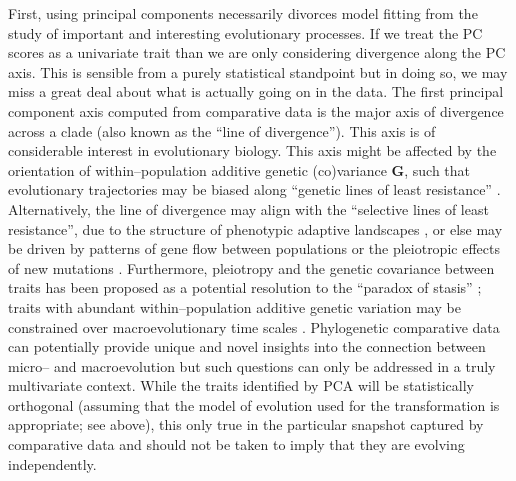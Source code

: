 \documentclass[a4paper,12pt]{article}
\begin{document}
First, using principal components necessarily divorces model fitting from the study of important and interesting evolutionary processes. If we treat the PC scores as a univariate trait than we are only considering divergence along the PC axis. This is sensible from a purely statistical standpoint but in doing so, we may miss a great deal about what is actually going on in the data. The first principal component axis computed from comparative data is the major axis of divergence across a clade (also known as the ``line of divergence''). This axis is of considerable interest in evolutionary biology. This axis might be affected by the orientation of within--population additive genetic (co)variance $\mathbf{G}$, such that evolutionary trajectories may be biased along ``genetic lines of least resistance'' \citep[i.e., divergence occurs primarily along the leading eigenvector of $\mathbf{G}$, $G_{\text{max}}$;][]{Schluter1996, Arnoldetal2001}. Alternatively, the line of divergence may align with the ``selective lines of least resistance'', due to the structure of phenotypic adaptive landscapes \citep{Arnold2003, Jonesetal2007, Arnoldetal2008}, or else may be driven by patterns of gene flow between populations \citep{Guillaume2007} or the pleiotropic effects of new mutations \citep{Jonesetal2007, Hether2013, Houle2013}. Furthermore, pleiotropy and the genetic covariance between traits has been proposed as a potential resolution to the ``paradox of stasis'' \citep{HansenHoule2004}; traits with abundant within--population additive genetic variation may be constrained over macroevolutionary time scales \citep{Kirkpatrick2009, WalshBlows2009}. Phylogenetic comparative data can potentially provide unique and novel insights into the connection between micro-- and macroevolution \citep{Hohenlohe2008} but such questions can only be addressed in a truly multivariate context. While the traits identified by PCA will be statistically orthogonal (assuming that the model of evolution used for the transformation is appropriate; see above), this only true in the particular snapshot captured by comparative data and should not be taken to imply that they are evolving independently. 
\end{document}
